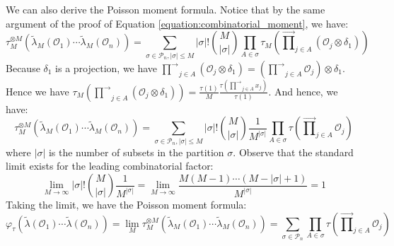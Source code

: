 \documentclass[a4paper,11pt]{article}
\theoremstyle{definition}
\numberwithin{equation}{section}
\begin{document}
We can also derive the Poisson moment formula. Notice that by the same argument of the proof of Equation \ref{equation:combinatorial_moment}, we have:
\begin{equation}
    \tau_M^{\otimes M}(\widetilde{\lambda}_M(\mathcal{O}_1)\cdots\widetilde{\lambda}_M(\mathcal{O}_n)) = \sum_{\sigma\in\mathcal{P}_n, |\sigma| \leq M}|\sigma|!\binom{M}{|\sigma|}\prod_{A\in\sigma}\tau_M(\overrightarrow{\prod}_{j\in A}(\mathcal{O}_j\otimes\delta_1))
\end{equation}
Because $\delta_1$ is a projection, we have $\overrightarrow{\prod}_{j\in A}(\mathcal{O}_j\otimes\delta_1) = (\overrightarrow{\prod}_{j\in A}\mathcal{O}_j)\otimes\delta_1$. Hence we have $\tau_M(\overrightarrow{\prod}_{j\in A}(\mathcal{O}_j\otimes\delta_1)) = \frac{\tau(1)}{M}\frac{\tau(\overrightarrow{\prod}_{j\in A}x_j)}{\tau(1)}$. And hence, we have:
\begin{equation}
    \tau_M^{\otimes M}(\widetilde{\lambda}_M(\mathcal{O}_1)\cdots\widetilde{\lambda}_M(\mathcal{O}_n)) = \sum_{\sigma\in\mathcal{P}_n, |\sigma| \leq M}|\sigma|!\binom{M}{|\sigma|}\frac{1}{M^{|\sigma|}}\prod_{A\in\sigma}\tau(\overrightarrow{\prod}_{j\in A}\mathcal{O}_j)
\end{equation}
where $|\sigma|$ is the number of subsets in the partition $\sigma$. Observe that the standard limit exists for the leading combinatorial factor:
\begin{equation}
    \lim_{M\rightarrow\infty}|\sigma|!\binom{M}{|\sigma|}\frac{1}{M^{|\sigma|}} = \lim_{M\rightarrow\infty}\frac{M(M-1)\cdots(M-|\sigma|+1)}{M^{|\sigma|}} =1 
\end{equation}
Taking the limit, we have the Poisson moment formula:
\begin{equation}
    \varphi_\tau(\widetilde{\lambda}(\mathcal{O}_1)\cdots\widetilde{\lambda}(\mathcal{O}_n)) = \lim_{M}\tau_M^{\otimes M}(\widetilde{\lambda}_M(\mathcal{O}_1)\cdots\widetilde{\lambda}_M(\mathcal{O}_n)) = \sum_{\sigma\in\mathcal{P}_n}\prod_{A\in\sigma}\tau(\overrightarrow{\prod}_{j\in A}\mathcal{O}_j)
\end{equation}
\end{document}
